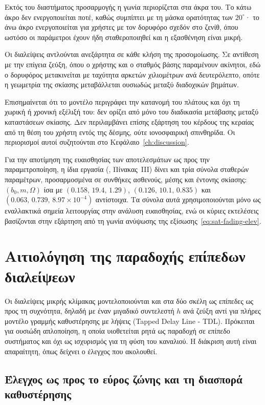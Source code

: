 Εκτός του διαστήματος προσαρμογής η γωνία περιορίζεται στα άκρα του. Το
κάτω άκρο δεν ενεργοποιείται ποτέ, καθώς συμπίπτει με τη μάσκα ορατότητας
των $20^\circ$· το άνω άκρο ενεργοποιείται για χρήστες με τον δορυφόρο
σχεδόν στο ζενίθ, όπου ωστόσο οι παράμετροι έχουν ήδη σταθεροποιηθεί και
η εξασθένηση είναι μικρή.

Οι διαλείψεις αντλούνται ανεξάρτητα σε κάθε κλήση της προσομοίωσης. Σε
αντίθεση με την επίγεια ζεύξη, όπου ο χρήστης και ο σταθμός βάσης
παραμένουν ακίνητοι, εδώ ο δορυφόρος μετακινείται με ταχύτητα αρκετών
χιλιομέτρων ανά δευτερόλεπτο, οπότε η γεωμετρία της σκίασης μεταβάλλεται
ουσιωδώς μεταξύ διαδοχικών βημάτων.

Επισημαίνεται ότι το μοντέλο περιγράφει την κατανομή του πλάτους και όχι
τη χωρική ή χρονική εξέλιξή του: δεν ορίζει από μόνο του διαδικασία
μετάβασης μεταξύ καταστάσεων σκίασης. Δεν περιλαμβάνει επίσης εξάρτηση
του κέρδους της κεραίας από τη θέση του χρήστη εντός της δέσμης, ούτε
ιονοσφαιρική σπινθηρίδα. Οι περιορισμοί αυτοί συζητούνται στο
Κεφάλαιο~\ref{ch:discussion}.

Για την αποτίμηση της ευαισθησίας των αποτελεσμάτων ως προς την
παραμετροποίηση, η ίδια εργασία (\cite{abdi2003lms}, Πίνακας~III) δίνει
και τρία σύνολα σταθερών παραμέτρων, προσαρμοσμένα σε συνθήκες ασθενούς,
μέσης και έντονης σκίασης: $(b_0, m, \Omega)$ ίσα με $(0.158,\,19.4,\,
1.29)$, $(0.126,\,10.1,\,0.835)$ και $(0.063,\,0.739,\,8.97\times
10^{-4})$ αντίστοιχα. Τα σύνολα αυτά χρησιμοποιούνται μόνο ως εναλλακτικά
σημεία λειτουργίας στην ανάλυση ευαισθησίας, ενώ οι κύριες εκτελέσεις
βασίζονται στην εξάρτηση από τη γωνία ανύψωσης της
εξίσωσης~\eqref{eq:sat-fading-elev}.

\section{Αιτιολόγηση της παραδοχής επίπεδων διαλείψεων}
\label{sec:meth-flat-fading}

Οι διαλείψεις μικρής κλίμακας μοντελοποιούνται και στα δύο σκέλη ως
επίπεδες ως προς τη συχνότητα, δηλαδή με έναν μιγαδικό συντελεστή $h$ ανά
ζεύξη αντί για πλήρες μοντέλο γραμμής καθυστέρησης με λήψεις (Tapped
Delay Line - TDL). Πρόκειται για ουσιώδη απλοποίηση, η οποία υιοθετείται
ρητά ως παραδοχή σε επίπεδο συστήματος και όχι ως ισχυρισμός για τη φύση
του καναλιού. Η διάκριση αυτή είναι απαραίτητη, όπως δείχνει ο έλεγχος
που ακολουθεί.

\subsection{Έλεγχος ως προς το εύρος ζώνης και τη διασπορά καθυστέρησης}

